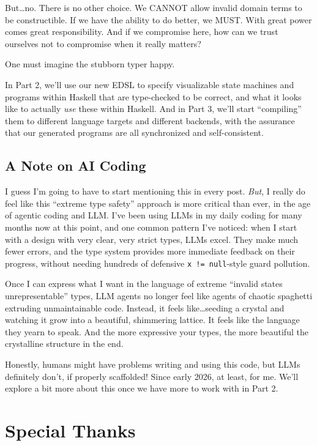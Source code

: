 \documentclass[]{article}
\begin{document}
But\ldots no. There is no other choice. We CANNOT allow invalid domain terms to
be constructible. If we have the ability to do better, we MUST. With great power
comes great responsibility. And if we compromise here, how can we trust
ourselves not to compromise when it really matters?

One must imagine the stubborn typer happy.

In Part 2, we'll use our new EDSL to specify visualizable state machines and
programs within Haskell that are type-checked to be correct, and what it looks
like to actually \emph{use} these within Haskell. And in Part 3, we'll start
``compiling'' them to different language targets and different backends, with
the assurance that our generated programs are all synchronized and
self-consistent.

\subsection{A Note on AI Coding}\label{a-note-on-ai-coding}

I guess I'm going to have to start mentioning this in every post. \emph{But}, I
really do feel like this ``extreme type safety'' approach is more critical than
ever, in the age of agentic coding and LLM. I've been using LLMs in my daily
coding for many months now at this point, and one common pattern I've noticed:
when I start with a design with very clear, very strict types, LLMs excel. They
make much fewer errors, and the type system provides more immediate feedback on
their progress, without needing hundreds of defensive \texttt{x\ !=\ null}-style
guard pollution.

Once I can express what I want in the language of extreme ``invalid states
unrepresentable'' types, LLM agents no longer feel like agents of chaotic
spaghetti extruding unmaintainable code. Instead, it feels like\ldots seeding a
crystal and watching it grow into a beautiful, shimmering lattice. It feels like
the language they yearn to speak. And the more expressive your types, the more
beautiful the crystalline structure in the end.

Honestly, humans might have problems writing and using this code, but LLMs
definitely don't, if properly scaffolded! Since early 2026, at least, for me.
We'll explore a bit more about this once we have more to work with in Part 2.

\section{Special Thanks}\label{special-thanks}
\end{document}

